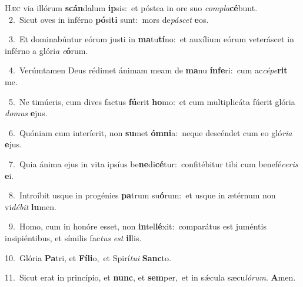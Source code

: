 \lettrine{\initial\textcolor{\initialcolor}{H}}{æc} via illórum \textbf{scán}\-dalum \textbf{ip}\-sis:~\star et póstea in ore suo \textit{com}\-\textit{pla}\textbf{cé}bunt.\\
{\numbfont\textcolor{\numbcolor}{~2.}}~Sicut oves in inférno \textbf{pó}\-si\textbf{ti} sunt:~\star mors de\-\textit{pá}\-\textit{scet} \textbf{e}\-os.\par
{\numbfont\textcolor{\numbcolor}{~3.}}~Et dominabúntur eórum justi in \textbf{ma}\-tu\-\textbf{tí}\-no:~\star et auxílium eórum veteráscet in inférno a glóri\textit{a} \textit{e}\-\textbf{ó}rum.\par
{\numbfont\textcolor{\numbcolor}{~4.}}~Verúmtamen Deus rédimet ánimam meam de \textbf{ma}\-nu \textbf{ín}\-\textbf{fe}ri:~\star cum ac\-\textit{cé}\-\textit{pe}\textbf{rit} me.\par
{\numbfont\textcolor{\numbcolor}{~5.}}~Ne timúeris, cum dives factus \textbf{fú}\-erit \textbf{ho}\-mo:~\star et cum multiplicáta fúerit glória \textit{do}\-\textit{mus} \textbf{e}\-jus.\par
{\numbfont\textcolor{\numbcolor}{~6.}}~Quóniam cum interíerit, non \textbf{su}\-met \textbf{óm}\-\textbf{ni}a:~\star neque descéndet cum eo gló\-\textit{ri}\-\textit{a} \textbf{e}\-jus.\par
{\numbfont\textcolor{\numbcolor}{~7.}}~Quia ánima ejus in vita ipsíus be\-\textbf{ne}\-di\-\textbf{cé}\-tur:~\star confitébitur tibi cum benefé\-\textit{ce}\-\textit{ris} \textbf{e}\-i.\par
{\numbfont\textcolor{\numbcolor}{~8.}}~Introíbit usque in progénies \textbf{pa}\-trum su\-\textbf{ó}\-rum:~\star et usque in ætérnum non vi\-\textit{dé}\-\textit{bit} \textbf{lu}\-men.\par
{\numbfont\textcolor{\numbcolor}{~9.}}~Homo, cum in honóre esset, non \textbf{in}\-tel\-\textbf{lé}\-xit:~\star comparátus est juméntis insipiéntibus, et símilis fac\textit{tus} \textit{est} \textbf{il}\-lis.\par
{\numbfont\textcolor{\numbcolor}{10.}}~Glória \textbf{Pa}\-tri, et \textbf{Fí}\-\textbf{li}o,~\star et Spirí\-\textit{tu}\-\textit{i} \textbf{Sanc}\-to.\par
{\numbfont\textcolor{\numbcolor}{11.}}~Sicut erat in princípio, et \textbf{nunc}\-, et \textbf{sem}\-per,~\star et in sǽcula sæcu\-\textit{ló}\-\textit{rum}. \textbf{A}\-men.\par
